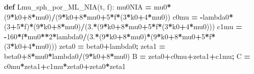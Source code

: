 \documentclass[
  a4paper,
  numbers=noendperiod,
  DIV=12]{scrreprt}
\newenvironment{Shaded}{\begin{snugshade}}{\end{snugshade}}
\newcommand{\DecValTok}[1]{\textcolor[rgb]{0.00,0.00,0.81}{#1}}
\newcommand{\FloatTok}[1]{\textcolor[rgb]{0.00,0.00,0.81}{#1}}
\newcommand{\KeywordTok}[1]{\textcolor[rgb]{0.13,0.29,0.53}{\textbf{#1}}}
\newcommand{\NormalTok}[1]{#1}
\newcommand{\OperatorTok}[1]{\textcolor[rgb]{0.81,0.36,0.00}{\textbf{#1}}}
\begin{document}
\begin{Shaded}
\begin{Highlighting}[]
\KeywordTok{def}\NormalTok{ Lmu\_sph\_por\_ML\_NIA(t, f):}
\NormalTok{    mu0NIA }\OperatorTok{=}\NormalTok{ mu0}\OperatorTok{*}\NormalTok{(}\DecValTok{9}\OperatorTok{*}\NormalTok{k0}\OperatorTok{+}\DecValTok{8}\OperatorTok{*}\NormalTok{mu0)}\OperatorTok{/}\NormalTok{(}\DecValTok{9}\OperatorTok{*}\NormalTok{k0}\OperatorTok{+}\DecValTok{8}\OperatorTok{*}\NormalTok{mu0}\OperatorTok{+}\DecValTok{5}\OperatorTok{*}\NormalTok{f}\OperatorTok{*}\NormalTok{(}\DecValTok{3}\OperatorTok{*}\NormalTok{k0}\OperatorTok{+}\DecValTok{4}\OperatorTok{*}\NormalTok{mu0))}
\NormalTok{    c0mu   }\OperatorTok{=} \OperatorTok{{-}}\NormalTok{lambda0}\OperatorTok{*}\NormalTok{(}\DecValTok{3}\OperatorTok{+}\DecValTok{5}\OperatorTok{*}\NormalTok{f)}\OperatorTok{*}\NormalTok{(}\DecValTok{9}\OperatorTok{*}\NormalTok{k0}\OperatorTok{+}\DecValTok{8}\OperatorTok{*}\NormalTok{mu0)}\OperatorTok{/}\NormalTok{(}\FloatTok{3.}\OperatorTok{*}\NormalTok{(}\DecValTok{9}\OperatorTok{*}\NormalTok{k0}\OperatorTok{+}\DecValTok{8}\OperatorTok{*}\NormalTok{mu0}\OperatorTok{+}\DecValTok{5}\OperatorTok{*}\NormalTok{f}\OperatorTok{*}\NormalTok{(}\DecValTok{3}\OperatorTok{*}\NormalTok{k0}\OperatorTok{+}\DecValTok{4}\OperatorTok{*}\NormalTok{mu0)))}
\NormalTok{    c1mu   }\OperatorTok{=} \OperatorTok{{-}}\DecValTok{160}\OperatorTok{*}\NormalTok{f}\OperatorTok{*}\NormalTok{mu0}\OperatorTok{**}\DecValTok{2}\OperatorTok{*}\NormalTok{lambda0}\OperatorTok{/}\NormalTok{(}\FloatTok{3.}\OperatorTok{*}\NormalTok{(}\DecValTok{9}\OperatorTok{*}\NormalTok{k0}\OperatorTok{+}\DecValTok{8}\OperatorTok{*}\NormalTok{mu0)}\OperatorTok{*}\NormalTok{(}\DecValTok{9}\OperatorTok{*}\NormalTok{k0}\OperatorTok{+}\DecValTok{8}\OperatorTok{*}\NormalTok{mu0}\OperatorTok{+}\DecValTok{5}\OperatorTok{*}\NormalTok{f}\OperatorTok{*}\NormalTok{(}\DecValTok{3}\OperatorTok{*}\NormalTok{k0}\OperatorTok{+}\DecValTok{4}\OperatorTok{*}\NormalTok{mu0)))}
\NormalTok{    zeta0 }\OperatorTok{=}\NormalTok{ beta0}\OperatorTok{+}\NormalTok{lambda0}\OperatorTok{;}\NormalTok{  zeta1 }\OperatorTok{=}\NormalTok{ beta0}\OperatorTok{+}\DecValTok{8}\OperatorTok{*}\NormalTok{mu0}\OperatorTok{*}\NormalTok{lambda0}\OperatorTok{/}\NormalTok{(}\DecValTok{9}\OperatorTok{*}\NormalTok{k0}\OperatorTok{+}\DecValTok{8}\OperatorTok{*}\NormalTok{mu0)}
\NormalTok{    B }\OperatorTok{=}\NormalTok{ zeta0}\OperatorTok{+}\NormalTok{c0mu}\OperatorTok{+}\NormalTok{zeta1}\OperatorTok{+}\NormalTok{c1mu}\OperatorTok{;}\NormalTok{  C }\OperatorTok{=}\NormalTok{ c0mu}\OperatorTok{*}\NormalTok{zeta1}\OperatorTok{+}\NormalTok{c1mu}\OperatorTok{*}\NormalTok{zeta0}\OperatorTok{+}\NormalTok{zeta0}\OperatorTok{*}\NormalTok{zeta1}

\end{Highlighting}
\end{Shaded}
\end{document}
